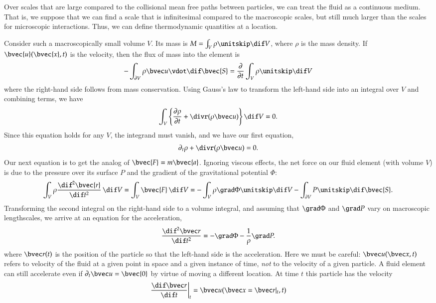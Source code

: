 Over scales that are large compared to the collisional mean free paths between particles, we can treat the fluid as a continuous medium.  That is, we suppose that we can find a scale that is infinitesimal compared to the macroscopic scales, but still much larger than the scales for microscopic interactions. Thus, we can define thermodynamic quantities at a location.

Consider such a macroscopically small volume $V$. Its mass is $M = \int_{V} \rho\nsp\dif V$, where $\rho$ is the mass density.  If $\bvec{u}(\bvec{x},t)$ is the velocity, then the flux of mass into the element is
\[
-\int_{\partial V}\rho\vu\vdot \dif \bvec{S} = \frac{\partial}{\partial t}\int_{V}\rho\nsp\dif V
\]
where the right-hand side follows from mass conservation.  Using Gauss's law to transform the left-hand side into an integral over $V$ and combining terms, we have
\[
\int_{V} \left\{ \frac{\partial\rho}{\partial t} + \divr(\rho\vu)\right\}\dif V = 0.
\]
Since this equation holds for any $V$, the integrand must vanish, and we have our first equation,
\begin{equation}\label{e.mass-conv}
\partial_{t}\rho + \divr(\rho\vu) = 0.
\end{equation}
Our next equation is to get the analog of $\bvec{F} = m\bvec{a}$.  Ignoring viscous effects, the net force on our fluid element (with volume $V$) is due to the pressure over its surface $P$ and the gradient of the gravitational potential $\Phi$:
\[
\int_{V}\rho \frac{\dif^{2}\bvec{r}}{\dif t^{2}}\,\dif V = \int_{V}\bvec{F}\,\dif V =  -\int_{V}\rho\grad\Phi\nsp\dif V - \int_{\partial V}P \nsp\dif \bvec{S}.
\]
Transforming the second integral on the right-hand side to a volume integral, and assuming that $\grad \Phi$ and $\grad P$ vary on macroscopic lengthscales, we arrive at an equation for the acceleration,
\begin{equation}\label{e.accel}
\frac{\dif^{2}\vr}{\dif t^{2}} = -\grad\Phi - \frac{1}{\rho}\grad P.
\end{equation}
where $\vr(t)$ is the position of the particle so that the left-hand side is the acceleration.
Here we must be careful: $\vu(\vx,t)$ refers to velocity of the fluid at a given point in space and a given instance of time, \emph{not} to the velocity of a given particle.  A fluid element can still accelerate even if $\partial_{t}\vu = \bvec{0}$ by virtue of moving a different location. At time $t$ this particle has the velocity
\begin{equation}\label{e.rdot}
\left.\frac{\dif\vr}{\dif t}\right|_{t} = \vu(\vx = \vr|_{t},t)
\end{equation}
